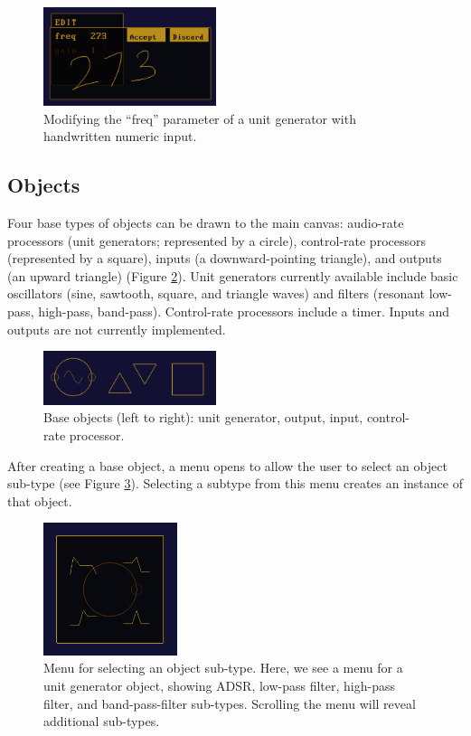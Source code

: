 \documentclass[10pt,letterpaper]{article}
\begin{document}
\begin{figure}[h]
	\centering
		\includegraphics[width=0.45\textwidth]{figures/editor.png}
	\caption{Modifying the ``freq'' parameter of a unit generator with handwritten numeric input.}
	\label{fig:editor}
\end{figure}

\subsection{Objects}
\label{sec:BaseGlyphs}

Four base types of objects can be drawn to the main canvas: audio-rate processors (unit generators; represented by a circle), control-rate processors (represented by a square), inputs (a downward-pointing triangle), and outputs (an upward triangle) (Figure \ref{fig:baseObjects}). 
Unit generators currently available include basic oscillators (sine, sawtooth, square, and triangle waves) and filters (resonant low-pass, high-pass, band-pass). 
Control-rate processors include a timer. 
Inputs and outputs are not currently implemented. 

\begin{figure}[h]
	\centering
		\includegraphics[width=0.45\textwidth]{figures/baseobjects.png}
	\caption{Base objects (left to right): unit generator, output, input, control-rate processor.}
	\label{fig:baseObjects}
\end{figure}

After creating a base object, a menu opens to allow the user to select an object sub-type (see Figure \ref{fig:objectMenu}). Selecting a subtype from this menu creates an instance of that object. 

\begin{figure}[h]
	\centering
		\includegraphics[width=0.35\textwidth]{figures/menu.png}
	\caption{Menu for selecting an object sub-type. Here, we see a menu for a unit generator object, showing ADSR, low-pass filter, high-pass filter, and band-pass-filter sub-types. Scrolling the menu will reveal additional sub-types.}
	\label{fig:objectMenu}
\end{figure}
\end{document}
